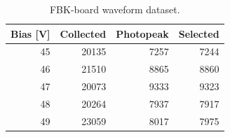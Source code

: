 \begin{table}[htbp]
\centering
\small
\begin{tabular}{rrrr}
\toprule
Bias [V] & Collected & Photopeak & Selected \\
\midrule
45 & 20135 & 7257 & 7244 \\
46 & 21510 & 8865 & 8860 \\
47 & 20073 & 9333 & 9323 \\
48 & 20264 & 7937 & 7917 \\
49 & 23059 & 8017 & 7975 \\
\bottomrule
\end{tabular}
\caption{FBK-board waveform dataset.}
\label{tab:fbk-board-dataset}
\end{table}
